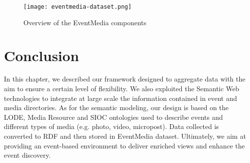 \begin{figure}[H]
  \centering
  \texttt{[image: eventmedia-dataset.png]}
  \caption{Overview of the EventMedia components}
  \label{fig:eventmedia-dataset}
\end{figure}


\section{Conclusion}   \label{sec:conclusion}
In this chapter, we described our framework designed to aggregate data with the aim to ensure a certain level of flexibility. We also exploited the Semantic Web technologies to integrate at large scale the information contained in event and media directories. As for the semantic modeling, our design is based on the LODE, Media Resource and SIOC ontologies used to describe events and different types of media (e.g. photo, video, micropost). Data collected is converted to RDF and then stored in EventMedia dataset. Ultimately, we aim at providing an event-based environment to deliver enriched views and enhance the event discovery.

